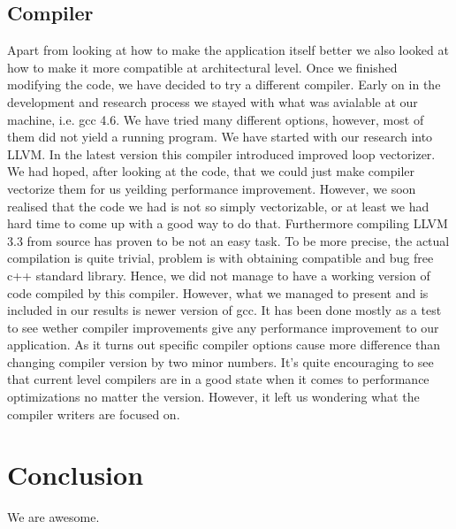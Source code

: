 \documentclass[conference]{IEEEtran}
\begin{document}
\subsection{Compiler}
Apart from looking at how to make the application itself better we also looked at how to make it more compatible at architectural level. Once we finished modifying the code, we have decided to try a different compiler. Early on in the development and research process we stayed with what was avialable at our machine, i.e. gcc 4.6. We have tried many different options, however, most of them did not yield a running program. We have started with our research into LLVM. In the latest version this compiler introduced improved loop vectorizer. We had hoped, after looking at the code, that we could just make compiler vectorize them for us yeilding performance improvement. However, we soon realised that the code we had is not so simply vectorizable, or at least we had hard time to come up with a good way to do that. Furthermore compiling LLVM 3.3 from source has proven to be not an easy task. To be more precise, the actual compilation is quite trivial, problem is with obtaining compatible and bug free c++ standard library. Hence, we did not manage to have a working version of code compiled by this compiler. However, what we managed to present and is included in our results is newer version of gcc. It has been done mostly as a test to see wether compiler improvements give any performance improvement to our application. As it turns out specific compiler options cause more difference than changing compiler version by two minor numbers. It's quite encouraging to see that current level compilers are in a good state when it comes to performance optimizations no matter the version. However, it left us wondering what the compiler writers are focused on.

\section{Conclusion}
We are awesome.
\end{document}
